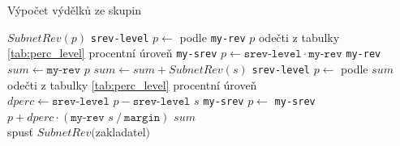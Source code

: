 \documentclass[a4wide,12pt]{report}
\begin{document}
\begin{algorithm}
\caption{Výpočet výdělků ze skupin}
\label{alg:points}
\begin{algorithmic}[]

 $SubnetRev( p )$
  \STATE \texttt{srev-level} $p\gets$ podle \texttt{my-rev} $p$ odečti z tabulky \ref{tab:perc_level} procentní úroveň
  \STATE{}
  \STATE \texttt{my-srev} $p\gets\texttt{srev-level}\cdot\texttt{my-rev}$
   \texttt{my-rev}
\ELSE
  \STATE{}
  \STATE $sum\gets\texttt{my-rev }p$
    \STATE $sum\gets sum + SubnetRev(s)$ 
  \ENDFOR
  \STATE \texttt{srev-level} $p\gets$ podle $sum$ odečti z tabulky \ref{tab:perc_level} procentní úroveň
    \STATE $dperc\gets \texttt{srev-level } p - \texttt{srev-level } s$ 
    \STATE \texttt{my-srev} $p\gets$ \texttt{my-srev} $p+dperc\cdot(\texttt{my-rev }s~/~\texttt{margin})$ 
  \ENDFOR
   $sum$
\ENDIF 
{}
\\
\STATE spusť $SubnetRev($zakladatel$)$

\end{algorithmic}
\end{algorithm}
\clearpage
\end{document}
